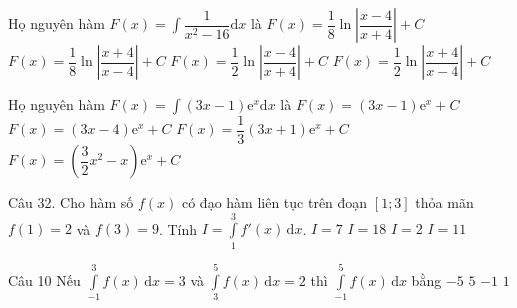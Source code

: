\begin{ex}%
Họ nguyên hàm $F(x)=\displaystyle\int\dfrac{1}{x^2-16}\mathrm{d}x$ là
\choice
{\True $F(x)=\dfrac{1}{8}\ln \left|\dfrac{x-4}{x+4}\right|+C$}
{$F(x)=\dfrac{1}{8}\ln \left|\dfrac{x+4}{x-4}\right|+C$}
{$F(x)=\dfrac{1}{2}\ln \left|\dfrac{x-4}{x+4}\right|+C$}
{$F(x)=\dfrac{1}{2}\ln \left|\dfrac{x+4}{x-4}\right|+C$}
\end{ex}

\begin{ex}%
Họ nguyên hàm $F(x)=\displaystyle\int(3x-1)\mathrm{e}^x\mathrm{d}x$ là
\choice
{$F(x)=(3x-1)\mathrm{e}^x+C$}
{\True $F(x)=(3x-4)\mathrm{e}^x+C$}
{$F(x)=\dfrac{1}{3}(3x+1)\mathrm{e}^x+C$}
{$F(x)=\left(\dfrac{3}{2}x^2-x\right)\mathrm{e}^x+C$}
\end{ex}

\begin{ex}  Câu 32.%
Cho hàm số $ f(x)$ có đạo hàm liên tục trên đoạn $[1;3]$ thỏa mãn $ f(1)=2$ và $ f(3)=9$. Tính $I=\int\limits_1^3{f'(x)\mathrm{\,d}x}$.
\choice
{\True $I=7$}
{$I=18$}
{$I=2$}
{$I=11$}
\end{ex}

\begin{ex}Câu 10%
Nếu $\displaystyle\int\limits_{-1}^3 f(x)\mathrm{\,d}x=3$ và $\displaystyle\int\limits_3^5 f(x)\mathrm{\,d}x=2$ thì $\displaystyle\int\limits_{-1}^5 f(x)\mathrm{\,d}x$ bằng
\choice
{$-5$}
{\True $5$}
{$-1$}
{$1$}
\end{ex}

